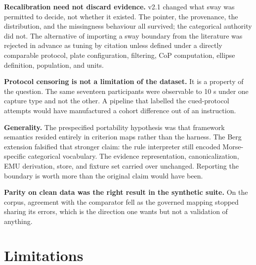 \documentclass[11pt]{article}
\begin{document}
\textbf{Recalibration need not discard evidence.} v2.1 changed what sway was permitted to decide, not whether it existed. The pointer, the provenance, the distribution, and the missingness behaviour all survived; the categorical authority did not. The alternative of importing a sway boundary from the literature was rejected in advance as tuning by citation unless defined under a directly comparable protocol, plate configuration, filtering, CoP computation, ellipse definition, population, and units.

\textbf{Protocol censoring is not a limitation of the dataset.} It is a property of the question. The same seventeen participants were observable to 10 s under one capture type and not the other. A pipeline that labelled the cued-protocol attempts would have manufactured a cohort difference out of an instruction.

\textbf{Generality.} The prespecified portability hypothesis was that framework semantics resided entirely in criterion maps rather than the harness. The Berg extension falsified that stronger claim: the rule interpreter still encoded Morse-specific categorical vocabulary. The evidence representation, canonicalization, EMU derivation, store, and fixture set carried over unchanged. Reporting the boundary is worth more than the original claim would have been.

\textbf{Parity on clean data was the right result in the synthetic suite.} On the corpus, agreement with the comparator fell as the governed mapping stopped sharing its errors, which is the direction one wants but not a validation of anything.

\section{Limitations}\label{limitations}
\end{document}

